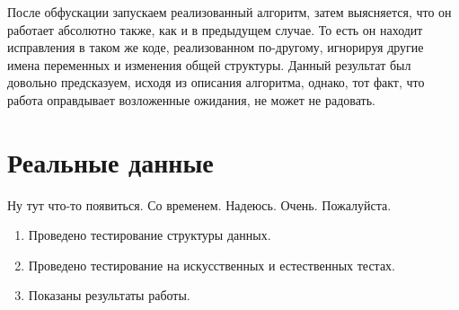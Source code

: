 После обфускации запускаем реализованный алгоритм, затем выясняется, что он работает абсолютно также, как и  в предыдущем случае.
То есть он находит исправления в таком же коде, реализованном по-другому, игнорируя другие имена переменных и изменения общей структуры.
Данный результат был довольно предсказуем, исходя из описания алгоритма, однако, тот факт, что работа оправдывает 
возложенные ожидания, не может не радовать.
\section{Реальные данные}
Ну тут что-то появиться. Со временем. Надеюсь. Очень. Пожалуйста.
\chapterconclusion

\begin{enumerate}
    \item Проведено тестирование структуры данных.
    \item Проведено тестирование на искусственных и естественных тестах.
    \item Показаны результаты работы.
\end{enumerate}
